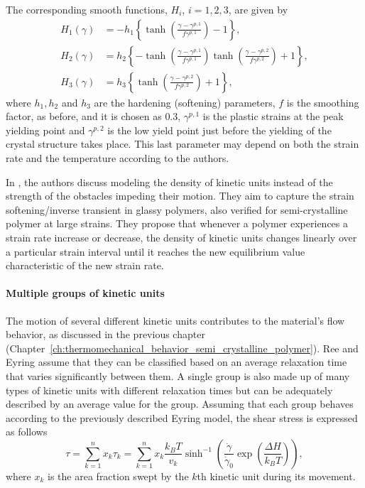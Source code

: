 The corresponding smooth functions, $H_i$, $i=1,2,3$, are given by
\begin{align}
	H_1(\gamma)&=-h_1\left\{\tanh \left(\frac{\gamma-\gamma^{p,1}}{f \gamma^{p,1}}\right)-1\right\}, \\
	H_2(\gamma)&=h_2\left\{-\tanh \left(\frac{\gamma-\gamma^{p,1}}{f \gamma^{p,1}}\right) \tanh \left(\frac{\gamma-\gamma^{p,2}}{f \gamma^{p,2}}\right)+1\right\}, \\
	H_3(\gamma)&=h_3\left\{\tanh \left(\frac{\gamma-\gamma^{p,2}}{f \gamma^{p,2}}\right)+1\right\},
\end{align}
where $h_1, h_2$ and $h_3$ are the hardening (softening) parameters, $f$ is the smoothing factor, as before, and it is chosen as $0.3$, $\gamma^{p,1}$ is the plastic strains at the peak yielding point and $\gamma^{p,2}$ is the low yield point just before the yielding of the crystal structure takes place.
This last parameter may depend on both the strain rate and the temperature according to the authors.


In \cite{gsellYieldTransientEffects1981}, the authors discuss modeling the density of kinetic units instead of the strength of the obstacles impeding their motion.
They aim to capture the strain softening/inverse transient in glassy polymers, also verified for semi-crystalline polymer at large strains.
They propose that whenever a polymer experiences a strain rate increase or decrease, the density of kinetic units changes linearly over a particular strain interval until it reaches the new equilibrium value characteristic of the new strain rate.

\paragraph{Multiple groups of kinetic units}

The motion of several different kinetic units contributes to the material's flow behavior, as discussed in the previous chapter (Chapter~\ref{ch:thermomechanical_behavior_semi_crystalline_polymer}).
Ree and Eyring \citep{reeTheoryNonNewtonian1955} assume that they can be classified based on an average relaxation time that varies significantly between them.
A single group is also made up of many types of kinetic units with different relaxation times but can be adequately described by an average value for the group.
Assuming that each group behaves according to the previously described Eyring model, the shear stress is expressed as follows
\begin{equation}
	\tau=\sum_{k=1}^n x_k \tau_k = \sum_{k=1}^n x_k\frac{k_B T}{v_k} \sinh^{-1}\left(\frac{\dot\gamma}{\dot\gamma_0}\exp\left(\frac{\Delta H}{k_B T}\right)\right),
\end{equation}
where $x_k$ is the area fraction swept by the $k$th kinetic unit during its movement.

